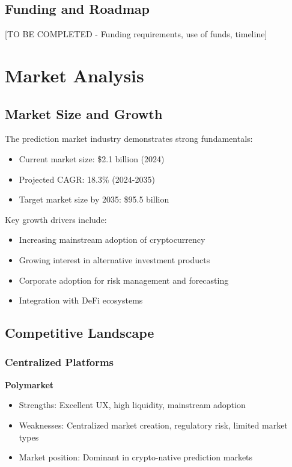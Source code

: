 \documentclass[11pt,a4paper]{article}
\begin{document}
\subsection{Funding and Roadmap}
[TO BE COMPLETED - Funding requirements, use of funds, timeline]

\section{Market Analysis}

\subsection{Market Size and Growth}
The prediction market industry demonstrates strong fundamentals:
\begin{itemize}
    \item Current market size: \$2.1 billion (2024)
    \item Projected CAGR: 18.3\% (2024-2035)
    \item Target market size by 2035: \$95.5 billion
\end{itemize}

Key growth drivers include:
\begin{itemize}
    \item Increasing mainstream adoption of cryptocurrency
    \item Growing interest in alternative investment products
    \item Corporate adoption for risk management and forecasting
    \item Integration with DeFi ecosystems
\end{itemize}

\subsection{Competitive Landscape}

\subsubsection{Centralized Platforms}
\textbf{Polymarket}
\begin{itemize}
    \item Strengths: Excellent UX, high liquidity, mainstream adoption
    \item Weaknesses: Centralized market creation, regulatory risk, limited market types
    \item Market position: Dominant in crypto-native prediction markets
\end{itemize}
\end{document}
